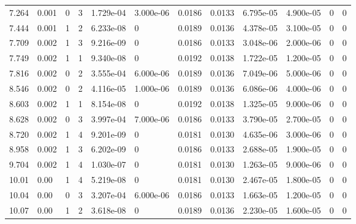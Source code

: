 \documentclass[preview]{standalone}
\begin{document}
{{\begin{tabular}{L{1.2cm}C{1.2cm} C{0.3cm}C{0.5cm} C{1.4cm}C{1.4cm} C{1.4cm}C{1.4cm} C{1.6cm}C{1.6cm} C{1.6cm}C{1.6cm}}
  7.264  &  0.001  & 0     &  3 &  1.729e-04  & 3.000e-06  &  0.0186&   0.0133& 6.795e-05 & 4.900e-05   &  0 & 0  \\ 
  7.444  &  0.001  & 1     &  2 &  6.233e-08  & 0  &  0.0189&   0.0136& 4.378e-05 & 3.100e-05   &  0 & 0  \\ 
  7.709  &  0.002  & 1     &  3 &  9.216e-09  & 0  &  0.0186&   0.0133& 3.048e-06 & 2.000e-06   &  0 & 0  \\ 
  7.749  &  0.002  & 1     &  1 &  9.340e-08  & 0  &  0.0192&   0.0138& 1.722e-05 & 1.200e-05   &  0 & 0  \\ 
  7.816  &  0.002  & 0     &  2 &  3.555e-04  & 6.000e-06  &  0.0189&   0.0136& 7.049e-06 & 5.000e-06   &  0 & 0  \\ 
  8.546  &  0.002  & 0     &  2 &  4.116e-05  & 1.000e-06  &  0.0189&   0.0136& 6.086e-06 & 4.000e-06   &  0 & 0  \\ 
  8.603  &  0.002  & 1     &  1 &  8.154e-08  & 0  &  0.0192&   0.0138& 1.325e-05 & 9.000e-06   &  0 & 0  \\ 
  8.628  &  0.002  & 0     &  3 &  3.997e-04  & 7.000e-06  &  0.0186&   0.0133& 3.790e-05 & 2.700e-05   &  0 & 0  \\ 
  8.720  &  0.002  & 1     &  4 &  9.201e-09  & 0  &  0.0181&   0.0130& 4.635e-06 & 3.000e-06   &  0 & 0  \\ 
  8.958  &  0.002  & 1     &  3 &  6.202e-09  & 0  &  0.0186&   0.0133& 2.688e-05 & 1.900e-05   &  0 & 0  \\ 
  9.704  &  0.002  & 1     &  4 &  1.030e-07  & 0  &  0.0181&   0.0130& 1.263e-05 & 9.000e-06   &  0 & 0  \\ 
  10.01  &  0.00  & 1     &  4 &  5.219e-08  & 0  &  0.0181&   0.0130& 2.467e-05 & 1.800e-05   &  0 & 0  \\ 
  10.04  &  0.00  & 0     &  3 &  3.207e-04  & 6.000e-06  &  0.0186&   0.0133& 1.663e-05 & 1.200e-05   &  0 & 0  \\ 
  10.07  &  0.00  & 1     &  2 &  3.618e-08  & 0  &  0.0189&   0.0136& 2.230e-05 & 1.600e-05   &  0 & 0  \\ 
\hline 
\end{tabular} 

}}
\end{document}
